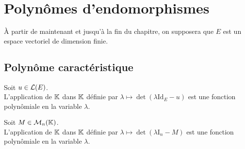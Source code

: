 \documentclass[a4paper]{book}
\begin{document}
\section{Polynômes d'endomorphismes}
À partir de maintenant et jusqu'à la fin du chapitre, on supposera que $E$ est un espace vectoriel de dimension finie.

\subsection{Polynôme caractéristique}
\begin{Lemme}
Soit $u\in \mathcal{L}(E)$.\\
L'application de $\mathbb{K} $ dans $\mathbb{K} $ définie par $\lambda     \mapsto \det(\lambda    \mathrm{Id}_E - u)$ est une fonction polynômiale en la variable $\lambda$.
\end{Lemme}

\begin{Lemme}
Soit $M\in \mathcal{M}_{n}(\mathbb{K})$.\\
L'application de $\mathbb{K} $ dans $\mathbb{K} $ définie par $\lambda     \mapsto \det(\lambda    \mathrm{I}_n - M)$ est une fonction polynômiale en la variable $\lambda$.
\end{Lemme}
\end{document}

